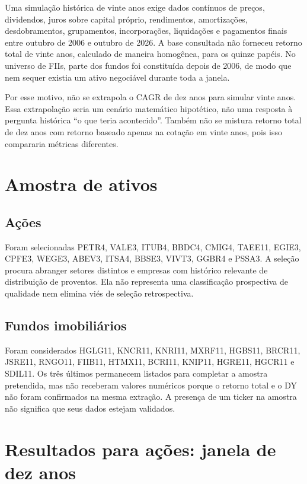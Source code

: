 \documentclass[11pt,a4paper]{article}
\begin{document}
Uma simulação histórica de vinte anos exige dados contínuos de preços, dividendos, juros sobre capital próprio, rendimentos, amortizações, desdobramentos, grupamentos, incorporações, liquidações e pagamentos finais entre outubro de 2006 e outubro de 2026. A base consultada não forneceu retorno total de vinte anos, calculado de maneira homogênea, para os quinze papéis. No universo de FIIs, parte dos fundos foi constituída depois de 2006, de modo que nem sequer existia um ativo negociável durante toda a janela.

Por esse motivo, não se extrapola o CAGR de dez anos para simular vinte anos. Essa extrapolação seria um cenário matemático hipotético, não uma resposta à pergunta histórica “o que teria acontecido”. Também não se mistura retorno total de dez anos com retorno baseado apenas na cotação em vinte anos, pois isso compararia métricas diferentes.

\section{Amostra de ativos}

\subsection{Ações}

Foram selecionadas PETR4, VALE3, ITUB4, BBDC4, CMIG4, TAEE11, EGIE3, CPFE3, WEGE3, ABEV3, ITSA4, BBSE3, VIVT3, GGBR4 e PSSA3. A seleção procura abranger setores distintos e empresas com histórico relevante de distribuição de proventos. Ela não representa uma classificação prospectiva de qualidade nem elimina viés de seleção retrospectiva.

\subsection{Fundos imobiliários}

Foram considerados HGLG11, KNCR11, KNRI11, MXRF11, HGBS11, BRCR11, JSRE11, RNGO11, FIIB11, HTMX11, BCRI11, KNIP11, HGRE11, HGCR11 e SDIL11. Os três últimos permanecem listados para completar a amostra pretendida, mas não receberam valores numéricos porque o retorno total e o DY não foram confirmados na mesma extração. A presença de um ticker na amostra não significa que seus dados estejam validados.

\section{Resultados para ações: janela de dez anos}
\end{document}
